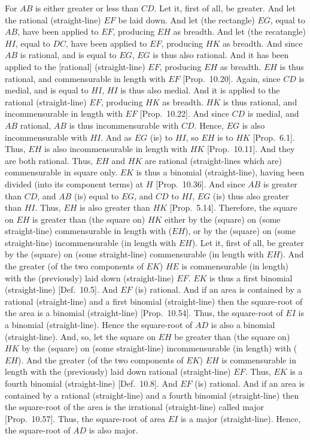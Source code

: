 \begin{Parallel}{}{}
{For $AB$ is either greater or less than $CD$. Let it, first of all,
be greater. And let the rational (straight-line) $EF$ be laid down. And
let (the rectangle) $EG$, equal to $AB$, have been applied to $EF$,
producing $EH$ as breadth. And let (the recatangle) $HI$, equal to $DC$,
have been applied to $EF$, producing $HK$ as breadth. And since
$AB$ is rational, and is equal to $EG$, $EG$ is thus also rational. And it
has been applied to the [rational] (straight-line) $EF$, producing $EH$
as breadth. $EH$ is thus rational, and commensurable in length
with $EF$ [Prop.~10.20]. Again, since
$CD$ is medial, and is equal to $HI$, $HI$ is thus also medial. 
And it is applied to the rational (straight-line) $EF$, producing
$HK$ as breadth. $HK$ is thus rational, and incommensurable
in length with $EF$ [Prop.~10.22]. And since
$CD$ is medial, and $AB$ rational, $AB$ is thus incommensurable
with $CD$. Hence, $EG$ is also incommensurable with $HI$. And
as $EG$ (is) to $HI$, so $EH$ is to $HK$ [Prop.~6.1].
Thus, $EH$ is also incommensurable in length with $HK$
[Prop.~10.11]. And they are both rational. Thus,
$EH$ and $HK$ are rational (straight-lines which are) commensurable in
 square only. $EK$ is thus a binomial (straight-line), having been divided
(into its component terms) at $H$ [Prop.~10.36].
And since $AB$ is greater than $CD$, and $AB$ (is) equal to $EG$, and
$CD$ to $HI$, $EG$ (is) thus also greater than $HI$. Thus, $EH$
is also greater than $HK$ [Prop.~5.14]. Therefore,
 the square on $EH$ is greater than (the square on) $HK$
either by the (square) on (some straight-line) commensurable in length
with ($EH$), or by the (square) on (some straight-line)  incommensurable
(in length with $EH$). 
Let it, first of all, be greater by the (square) on (some straight-line)
commensurable (in length with $EH$). And the greater (of the two components of $EK$) $HE$ is commensurable
(in length) with the (previously) laid down (straight-line) $EF$. $EK$ is thus a first binomial
(straight-line) [Def.~10.5]. And $EF$ (is) rational. And if an area is contained by a rational (straight-line) and a first
binomial (straight-line) then the square-root  of the  area is a binomial
(straight-line)  [Prop.~10.54]. Thus,
the square-root of $EI$ is a binomial (straight-line). Hence the square-root of $AD$ is also a binomial (straight-line).  And, so, let the
 square on $EH$ be greater than (the square on) $HK$ by the (square) on 
 (some straight-line) incommensurable (in length) with ($EH$). And the
 greater (of the two components of $EK$) $EH$ is commensurable in length with the (previously)
 laid down rational (straight-line) $EF$. Thus, $EK$ is a fourth
 binomial (straight-line) [Def.~10.8]. And
 $EF$ (is) rational. And if an area
 is contained by a rational (straight-line) and a fourth binomial (straight-line) 
 then the square-root of the area is the irrational (straight-line) called
 major [Prop.~10.57]. Thus, the square-root
 of area $EI$ is a major (straight-line). Hence, the square-root of
 $AD$ is also major.
 
}
\end{Parallel}
